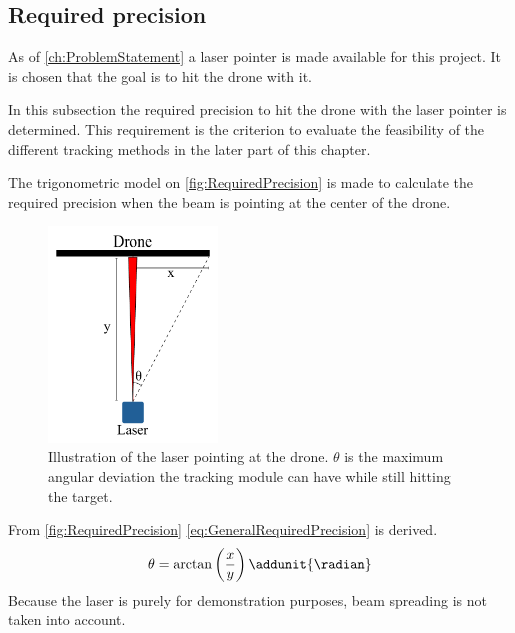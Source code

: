 \subsection{Required precision} \label{sec:RequiredPrecision}
As of \autoref{ch:ProblemStatement} a laser pointer is made available for this project. It is chosen that the goal is to hit the drone with it. 

In this subsection the required precision to hit the drone with the laser pointer is determined. This requirement is the criterion to evaluate the feasibility of the different tracking methods in the later part of this chapter. 
 
The trigonometric model on \autoref{fig:RequiredPrecision} is made to calculate the required precision when the beam is pointing at the center of the drone. 
\begin{figure}[h!]
    \centering
        \includegraphics[width=0.4\textwidth]{figures/tracking/required_precision.pdf}
        \caption{Illustration of the laser pointing at the drone. $\theta$ is the maximum angular deviation the tracking module can have while still hitting the target.}
        \label{fig:RequiredPrecision}
\end{figure}

\newpage
From \autoref{fig:RequiredPrecision} \autoref{eq:GeneralRequiredPrecision} is derived. 
\begin{equation} \label{eq:GeneralRequiredPrecision}
\theta = \arctan \left( \frac{x}{y} \right) \addunit{\radian}
\end{equation}
\startexplain
{}
\stopexplain
Because the laser is purely for demonstration purposes, beam spreading is not taken into account. 

